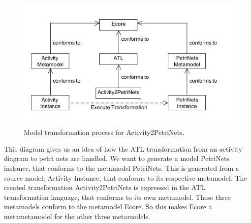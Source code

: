 \documentclass[pdftex,11pt,a4paper]{article}
\begin{document}
\begin{figure}[H]
	\centering
	\includegraphics[scale=0.5]{figures/ATL.png}
	\caption{Model transformation process for Activity2PetriNets.}
	\label{fig:ATL}
\end{figure}

This diagram gives us an idea of how the ATL transformation from an activity
diagram to petri nets are handled. We want to generate a model PetriNets
instance, that conforms to the metamodel PetriNets. This is generated from a
source model, Activity Instance, that conforms to its respective metamodel.
The created transformation Activity2PetriNets is expressed in the ATL
transformation  language, that conforms to its own metamodel. These three
metamodels conform to the metamodel Ecore. So this makes Ecore a metametamodel
for the other three metamodels. 
\end{document}
